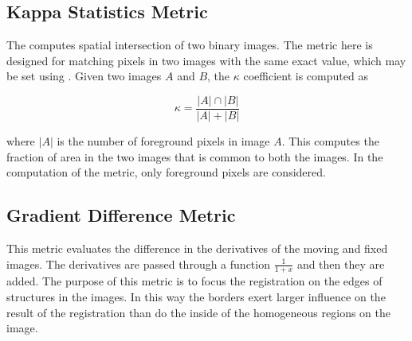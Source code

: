 \subsection{Kappa Statistics Metric}
The  computes spatial intersection of 
two binary images. The metric here is designed for matching pixels in two images 
with the same exact value, which may be set using . 
Given two images $A$ and $B$, the $\kappa$ coefficient is computed as
 
\begin{equation}
\kappa = \frac{|A| \cap |B|}{|A| + |B|}
\end{equation}

where $|A|$ is the number of foreground pixels in image $A$.  This computes the
fraction of area in the two images that is common to both the images. In the
computation of the metric, only foreground pixels are considered.

\subsection{Gradient Difference Metric}

This  metric evaluates the
difference in the derivatives of the moving and fixed images. The derivatives
are passed through a function $\frac{1}{1+x}$ and then they are added. The
purpose of this metric is to focus the registration on the edges of structures
in the images.  In this way the borders exert larger influence on the result
of the registration than do the inside of the homogeneous regions on the image.


